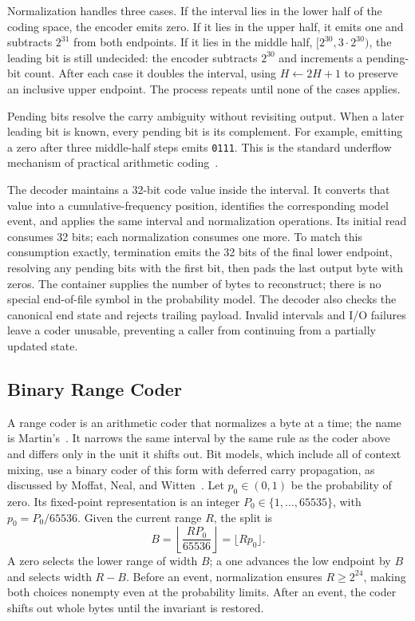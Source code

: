 \documentclass[10pt,letterpaper]{article}
\newcommand{\code}[1]{\texttt{#1}}
\begin{document}
Normalization handles three cases. If the interval lies in the lower half of the coding space, the encoder emits zero. If it lies in the upper half, it emits one and subtracts $2^{31}$ from both endpoints. If it lies in the middle half, $[2^{30},3\cdot2^{30})$, the leading bit is still undecided: the encoder subtracts $2^{30}$ and increments a pending-bit count. After each case it doubles the interval, using $H\leftarrow 2H+1$ to preserve an inclusive upper endpoint. The process repeats until none of the cases applies.

Pending bits resolve the carry ambiguity without revisiting output. When a later leading bit is known, every pending bit is its complement. For example, emitting a zero after three middle-half steps emits \code{0111}. This is the standard underflow mechanism of practical arithmetic coding~\cite{witten}.

The decoder maintains a 32-bit code value inside the interval. It converts that value into a cumulative-frequency position, identifies the corresponding model event, and applies the same interval and normalization operations. Its initial read consumes 32 bits; each normalization consumes one more. To match this consumption exactly, termination emits the 32 bits of the final lower endpoint, resolving any pending bits with the first bit, then pads the last output byte with zeros. The container supplies the number of bytes to reconstruct; there is no special end-of-file symbol in the probability model. The decoder also checks the canonical end state and rejects trailing payload. Invalid intervals and I/O failures leave a coder unusable, preventing a caller from continuing from a partially updated state.

\subsection{Binary Range Coder}
A range coder is an arithmetic coder that normalizes a byte at a time; the name is Martin's~\cite{martin}. It narrows the same interval by the same rule as the coder above and differs only in the unit it shifts out. Bit models, which include all of context mixing, use a binary coder of this form with deferred carry propagation, as discussed by Moffat, Neal, and Witten~\cite[Sec.~4.2]{moffat}. Let $p_0\in(0,1)$ be the probability of zero. Its fixed-point representation is an integer $P_0\in\{1,\ldots,65535\}$, with $p_0=P_0/65536$. Given the current range $R$, the split is
\begin{equation}
  B=\left\lfloor\frac{RP_0}{65536}\right\rfloor=\lfloor Rp_0\rfloor.
\end{equation}
A zero selects the lower range of width $B$; a one advances the low endpoint by $B$ and selects width $R-B$. Before an event, normalization ensures $R\geq2^{24}$, making both choices nonempty even at the probability limits. After an event, the coder shifts out whole bytes until the invariant is restored.
\end{document}
